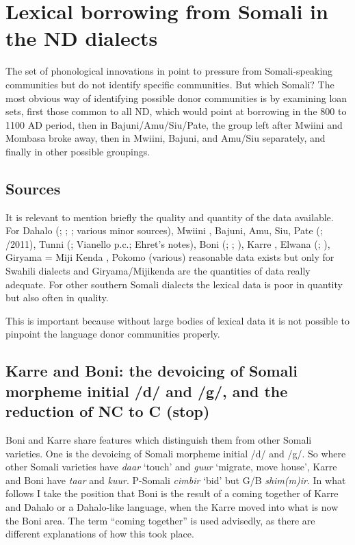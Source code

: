 \documentclass[output=paper
,newtxmath
,modfonts
,nonflat]{langsci/langscibook}
\begin{document}
\section{Lexical borrowing from Somali in the ND dialects}\label{sec:nurse:5} The set of phonological innovations in  point to pressure from Somali-speaking communities but do not identify specific communities. But which Somali? The most obvious way of identifying possible donor communities is by examining loan sets, first those common to all ND, which would point at borrowing in the 800 to 1100 AD period, then in Bajuni/Amu/Siu/Pate, the group left after Mwiini and Mombasa broke away, then in Mwiini, Bajuni, and Amu/Siu separately, and finally in other possible groupings.

\subsection{Sources}\label{sec:nurse:5.1} It is relevant to mention briefly the quality and quantity of the data available. For Dahalo (\citealt{Nurse1986}; \citealt{Ehret1989}; \citealt{Tosco1991}; various minor sources), Mwiini \citep{Kisseberth2004}, Bajuni, Amu, Siu, Pate (\citealt{Sacleux1939}; \citealt{Nurse2013}/2011), Tunni (\citealt{Tosco1997}; Vianello p.c.; Ehret's notes), Boni  (\citealt{Heine1977}; \citeyear{heine1982}; \citealt{sasse1979}), Karre \citep{Tosco1994}, Elwana (\citealt{nurse1994}; \citeyear{Nurse2000}), Giryama = Miji Kenda \citep{Deed1964}, Pokomo (various) reasonable data exists but only for Swahili dialects and Giryama/Mijikenda are the quantities of data really adequate. For other southern Somali dialects the lexical data is poor in quantity but also often in quality. 

  This is important because without large bodies of lexical data it is not possible to pinpoint the language donor communities properly.

\subsection{Karre and Boni: the devoicing of Somali morpheme initial /d/ and /g/, and the reduction of NC to C (stop)}\label{sec:nurse:5.2} Boni and Karre share features which distinguish them from other Somali varieties. One is the devoicing of Somali morpheme initial /d/ and /g/. So where other Somali varieties have \textit{daar} ‘touch’ and \textit{guur} ‘migrate, move house’, Karre and Boni have \textit{taar} and \textit{kuur}. P-Somali \textit{cimbir} ‘bid’ but G/B \textit{shim(m)ir}. In what follows I take the position that Boni is the result of a coming together of Karre and Dahalo or a Dahalo-like language, when the Karre moved into what is now the Boni area. The term “coming together” is used advisedly, as there are different explanations of how this took place.  
\end{document}
